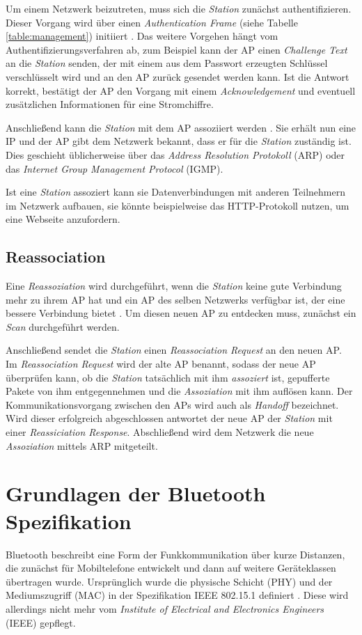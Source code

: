 Um einem Netzwerk beizutreten, muss sich die \emph{Station} zunächst authentifizieren. 
Dieser Vorgang wird über einen \emph{Authentication Frame} (siehe Tabelle \ref{table:management}) initiiert \cite{ieee2012auth}. 
Das weitere Vorgehen hängt vom Authentifizierungsverfahren ab, zum Beispiel kann der AP einen \emph{Challenge Text} an die \emph{Station} senden, der mit einem aus dem Passwort erzeugten Schlüssel verschlüsselt wird und an den AP zurück gesendet werden kann. 
Ist die Antwort korrekt, bestätigt der AP den Vorgang mit einem \emph{Acknowledgement} und eventuell zusätzlichen Informationen für eine Stromchiffre. 

Anschließend kann die \emph{Station} mit dem AP assoziiert werden \cite{ieee2012associate}. 
Sie erhält nun eine IP und der AP gibt dem Netzwerk bekannt, dass er für die \emph{Station} zuständig ist. 
Dies geschieht üblicherweise über das \emph{Address Resolution Protokoll} (ARP) oder das \emph{Internet Group Management Protocol} (IGMP).

Ist eine \emph{Station} assoziert kann sie Datenverbindungen mit anderen Teilnehmern im Netzwerk aufbauen, sie könnte beispielweise das HTTP-Protokoll nutzen, um eine Webseite anzufordern.

\subsection{Reassociation}
Eine \emph{Reassoziation} wird durchgeführt, wenn die \emph{Station} keine gute Verbindung mehr zu ihrem AP hat und ein AP des selben Netzwerks verfügbar ist, der eine bessere Verbindung bietet \cite{ieee2012reassociate}.
Um diesen neuen AP zu entdecken muss, zunächst ein \emph{Scan} durchgeführt werden. 

Anschließend sendet die \emph{Station} einen \emph{Reassociation Request} an den neuen AP. 
Im \emph{Reassociation Request} wird der alte AP benannt, sodass der neue AP überprüfen kann, ob die \emph{Station} tatsächlich mit ihm \emph{assoziert} ist, gepufferte Pakete von ihm entgegennehmen und die \emph{Assoziation} mit ihm auflösen kann.
Der Kommunikationsvorgang zwischen den APs wird auch als \emph{Handoff} bezeichnet. 
Wird dieser erfolgreich abgeschlossen antwortet der neue AP der \emph{Station} mit einer \emph{Reassiciation Response}.
Abschließend wird dem Netzwerk die neue \emph{Assoziation} mittels ARP mitgeteilt.


\section{Grundlagen der Bluetooth Spezifikation}
Bluetooth beschreibt eine Form der Funkkommunikation über kurze Distanzen, die zunächst für Mobiltelefone entwickelt und dann auf weitere Geräteklassen übertragen wurde.
Ursprünglich wurde die physische Schicht (PHY) und der Mediumszugriff (MAC) in der Spezifikation IEEE 802.15.1 definiert \cite{ieee2002blue}. 
Diese wird allerdings nicht mehr vom \emph{Institute of Electrical and Electronics Engineers} (IEEE) gepflegt. 

